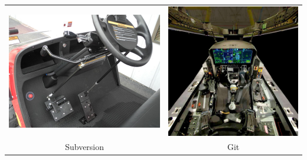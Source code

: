 \documentclass{beamer}
\begin{document}
\begin{frame}
\begin{tabular}{cc}
  \includegraphics[height=0.4\textheight]{golfcart.jpg}
  &
  \includegraphics[height=0.5\textheight]{f35.jpg}
   \\
   Subversion&Git
 \end{tabular}
\end{frame}

\end{document}
